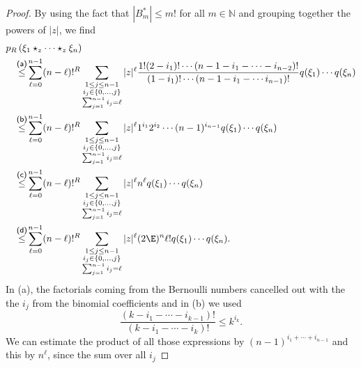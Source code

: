 \begin{proof}
    By using the fact that $|B_m^*| \leq m!$ for all $m \in
    \mathbb{N}$ and grouping together the powers of $|z|$, we find
    \begin{align*}
        &p_R \left(
            \xi_1 \star_z \cdots \star_z \xi_n
        \right) \\
        & \quad \ot{(a)}{\leq}
        \sum\limits_{\ell = 0}^{n-1}
        (n - \ell)!^R
        \sum\limits_{\substack{
			1 \leq j \leq n-1 \\
			i_j \in \{0, \ldots, j\} \\
			\sum_{j = 1}^{n - 1} i_j = \ell
		}}
        |z|^{\ell}
        \frac{1!  (2 - i_1)! \cdots (n-1 - i_1 - \cdots - i_{n-2})!}
        {(1 - i_1)! \cdots (n-1 - i_1 - \cdots i_{n-1})!}
        q(\xi_1) \cdots q(\xi_n)
        \\
        &\quad\ot{(b)}{\leq}
        \sum\limits_{\ell = 0}^{n-1}
        (n - \ell)!^R
        \sum\limits_{\substack{
			1 \leq j \leq n-1 \\
			i_j \in \{0, \ldots, j\} \\
			\sum_{j = 1}^{n - 1} i_j = \ell
		}}
        |z|^{\ell}
        1^{i_1} 2^{i_2}
        \cdots (n-1)^{i_{n-1}}
        q(\xi_1) \cdots q(\xi_n)
        \\
        &\quad\ot{(c)}{\leq}
        \sum\limits_{\ell = 0}^{n-1}
        (n - \ell)!^R
        \sum\limits_{\substack{
			1 \leq j \leq n-1 \\
			i_j \in \{0, \ldots, j\} \\
			\sum_{j = 1}^{n - 1} i_j = \ell
		}}
        |z|^{\ell}
        n^{\ell}
        q(\xi_1) \cdots q(\xi_n)
        \\
        &\quad\ot{(d)}{\leq}
        \sum\limits_{\ell = 0}^{n-1}
        (n - \ell)!^R
        \sum\limits_{\substack{
			1 \leq j \leq n-1 \\
			i_j \in \{0, \ldots, j\} \\
			\sum_{j = 1}^{n - 1} i_j = \ell
		}}
        |z|^{\ell} (2 \E)^n \ell!
        q(\xi_1) \cdots q(\xi_n).
    \end{align*}
    In (a), the factorials coming from the Bernoulli numbers cancelled out with 
    the the $i_j$ from the binomial coefficients and in (b) we used
    \begin{equation*}
    		\frac{(k - i_1 - \cdots - i_{k-1})!}
    		{(k - i_1 - \cdots - i_k)!}
    		\leq
    		k^{i_k}.
    \end{equation*}
    We can estimate the product of all those expressions by $(n-1)^{i_1 + 
    \cdots + i_{n-1}}$ and this by $n^\ell$, since the sum over all $i_j$ 

\end{proof}
